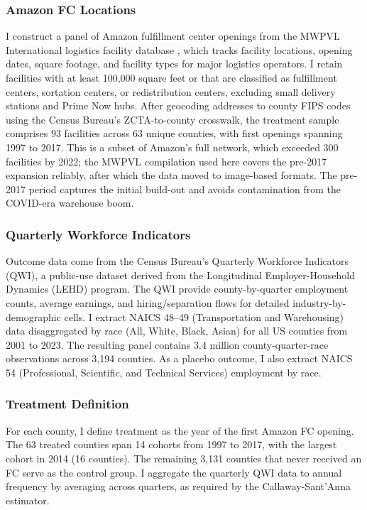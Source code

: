 \documentclass[12pt]{article}
\begin{document}
\subsubsection*{Amazon FC Locations} I construct a panel of Amazon fulfillment center openings from the MWPVL International logistics facility database \citep{MWPVL2016}, which tracks facility locations, opening dates, square footage, and facility types for major logistics operators. I retain facilities with at least 100,000 square feet or that are classified as fulfillment centers, sortation centers, or redistribution centers, excluding small delivery stations and Prime Now hubs. After geocoding addresses to county FIPS codes using the Census Bureau's ZCTA-to-county crosswalk, the treatment sample comprises 93 facilities across 63 unique counties, with first openings spanning 1997 to 2017. This is a subset of Amazon's full network, which exceeded 300 facilities by 2022; the MWPVL compilation used here covers the pre-2017 expansion reliably, after which the data moved to image-based formats. The pre-2017 period captures the initial build-out and avoids contamination from the COVID-era warehouse boom.

\subsubsection*{Quarterly Workforce Indicators} Outcome data come from the Census Bureau's Quarterly Workforce Indicators (QWI), a public-use dataset derived from the Longitudinal Employer-Household Dynamics (LEHD) program. The QWI provide county-by-quarter employment counts, average earnings, and hiring/separation flows for detailed industry-by-demographic cells. I extract NAICS 48--49 (Transportation and Warehousing) data disaggregated by race (All, White, Black, Asian) for all US counties from 2001 to 2023. The resulting panel contains 3.4 million county-quarter-race observations across 3,194 counties. As a placebo outcome, I also extract NAICS 54 (Professional, Scientific, and Technical Services) employment by race.

\subsubsection*{Treatment Definition} For each county, I define treatment as the year of the first Amazon FC opening. The 63 treated counties span 14 cohorts from 1997 to 2017, with the largest cohort in 2014 (16 counties). The remaining 3,131 counties that never received an FC serve as the control group. I aggregate the quarterly QWI data to annual frequency by averaging across quarters, as required by the Callaway-Sant'Anna estimator.
\end{document}
